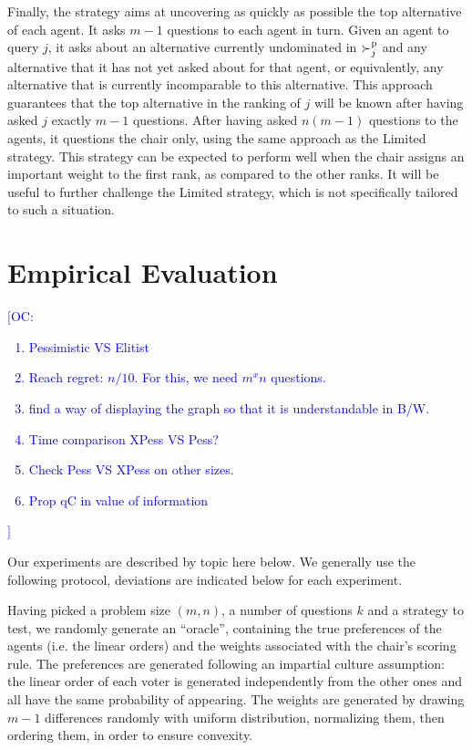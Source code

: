 \documentclass[sigconf, anonymous]{aamas}
\newcommand{\commentOC}[1]{\textcolor{blue}{\small$\big[$OC: #1$\big]$}}
\begin{document}
Finally, the  strategy aims at uncovering as quickly as possible the top alternative of each agent. It asks $m-1$ questions to each agent in turn. 
Given an agent to query $j$, it asks about an alternative currently undominated in $\succ^\text{p}_j$ and any alternative that it has not yet asked about for that agent, or equivalently, any alternative that is currently incomparable to this alternative. This approach guarantees that the top alternative in the ranking of $j$ will be known after having asked $j$ exactly $m-1$ questions.
After having asked $n (m-1)$ questions to the agents, it questions the chair only, using the same approach as the Limited strategy.
This strategy can be expected to perform well when the chair assigns an important weight to the first rank, as compared to the other ranks. It will be useful to further challenge the Limited strategy, which is not specifically tailored to such a situation.


\section{Empirical Evaluation} 
\label{sec:experiments}
\commentOC{
	\begin{enumerate}
		\item Pessimistic VS Elitist
		\item Reach regret: $n/10$. For this, we need $m^x n$ questions. 
		\item find a way of displaying the graph so that it is understandable in B/W.
		\item Time comparison XPess VS Pess?
		\item Check Pess VS XPess on other sizes.
		\item Prop qC in value of information
	\end{enumerate}
}
Our experiments are described by topic here below. We generally use the following protocol, deviations are indicated below for each experiment.

Having picked a problem size $(m, n)$, a number of questions $k$ and a strategy to test, we randomly generate an “oracle”, containing the true preferences of the agents (i.e. the linear orders) and the weights associated with the chair's scoring rule. 
The preferences are generated following an impartial culture assumption: the linear order of each voter is generated independently from the other ones and all have the same probability of appearing. The weights are generated by drawing $m-1$ differences randomly with uniform distribution, normalizing them, then ordering them, in order to ensure convexity.
\end{document}
